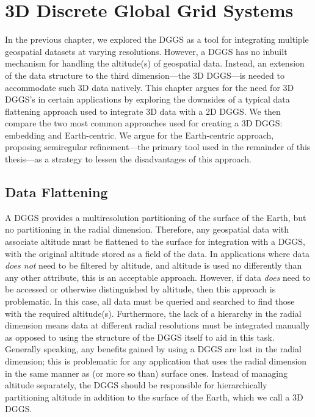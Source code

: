 \chapter{3D Discrete Global Grid Systems} \label{chap:3ddggs}
In the previous chapter, we explored the DGGS as a tool for integrating multiple geospatial datasets at varying resolutions.
However, a DGGS has no inbuilt mechanism for handling the altitude(s) of geospatial data.
Instead, an extension of the data structure to the third dimension---the 3D DGGS---is needed to accommodate such 3D data natively.
This chapter argues for the need for 3D DGGS's in certain applications by exploring the downsides of a typical data flattening approach used to integrate 3D data with a 2D DGGS.
We then compare the two most common approaches used for creating a 3D DGGS: embedding and Earth-centric.
We argue for the Earth-centric approach, proposing semiregular refinement---the primary tool used in the remainder of this thesis---as a strategy to lessen the disadvantages of this approach.


\section{Data Flattening}
A DGGS provides a multiresolution partitioning of the surface of the Earth, but no partitioning in the radial dimension.
Therefore, any geospatial data with associate altitude must be flattened to the surface for integration with a DGGS, with the original altitude stored as a field of the data.
In applications where data \textit{does not} need to be filtered by altitude, and altitude is used no differently than any other attribute, this is an acceptable approach.
However, if data \textit{does} need to be accessed or otherwise distinguished by altitude, then this approach is problematic.
In this case, all data must be queried and searched to find those with the required altitude(s).
Furthermore, the lack of a hierarchy in the radial dimension means data at different radial resolutions must be integrated manually as opposed to using the structure of the DGGS itself to aid in this task.
Generally speaking, any benefits gained by using a DGGS are lost in the radial dimension; this is problematic for any application that uses the radial dimension in the same manner as (or more so than) surface ones.
Instead of managing altitude separately, the DGGS should be responsible for hierarchically partitioning altitude in addition to the surface of the Earth, which we call a 3D DGGS.


